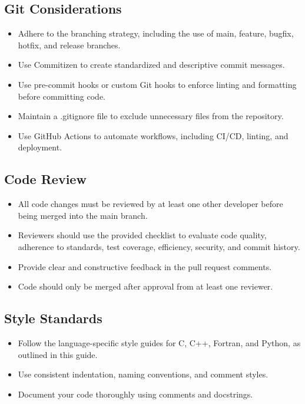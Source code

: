 \documentclass{ol-softwaremanual}
\begin{document}
\subsection{Git Considerations}
\begin{itemize}
\item Adhere to the branching strategy, including the use of main, feature, bugfix, hotfix, and release branches.
\item Use Commitizen to create standardized and descriptive commit messages.
\item Use pre-commit hooks or custom Git hooks to enforce linting and formatting before committing code.
\item Maintain a .gitignore file to exclude unnecessary files from the repository.
\item Use GitHub Actions to automate workflows, including CI/CD, linting, and deployment.
\end{itemize}

\subsection{Code Review}
\begin{itemize}
\item All code changes must be reviewed by at least one other developer before being merged into the main branch.
\item Reviewers should use the provided checklist to evaluate code quality, adherence to standards, test coverage, efficiency, security, and commit history.
\item Provide clear and constructive feedback in the pull request comments.
\item Code should only be merged after approval from at least one reviewer.
\end{itemize}

\subsection{Style Standards}
\begin{itemize}
\item Follow the language-specific style guides for C, C++, Fortran, and Python, as outlined in this guide.
\item Use consistent indentation, naming conventions, and comment styles.
\item Document your code thoroughly using comments and docstrings.
\end{itemize}
\end{document}
